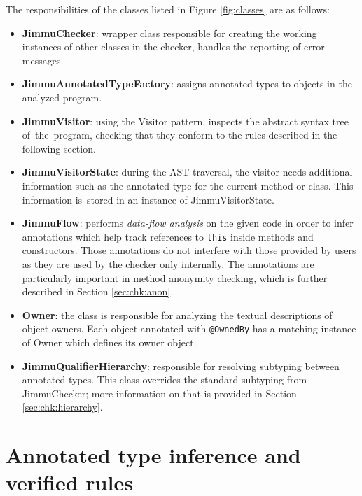 \documentclass{pracamgr}
\theoremstyle{break}
\theoremstyle{break}
\theoremstyle{break}
\begin{document}
The responsibilities of the classes listed in Figure \ref{fig:classes}
are as follows:
\begin{itemize}
\item \textbf{JimmuChecker}: wrapper class responsible for creating
  the working instances of other classes in the checker, handles the
  reporting of error messages.
\item \textbf{JimmuAnnotatedTypeFactory}: assigns annotated types to
  objects in the analyzed program.
\item \textbf{JimmuVisitor}: using the Visitor pattern, inspects the
  abstract syntax tree of~the~program, checking that they conform to
  the rules described in the following section. 
\item \textbf{JimmuVisitorState}: during the AST traversal, the
  visitor needs additional information such as the annotated type for
  the current method or class. This information is~stored in an
  instance of JimmuVisitorState. 
\item \textbf{JimmuFlow}: performs \emph{data-flow analysis} on the
  given code in order to infer annotations which help track references
  to \texttt{this} inside methods and constructors. Those annotations
  do not interfere with those provided by users as they are used by
  the checker only internally. The annotations are particularly
  important in method anonymity checking, which is further described
  in Section \ref{sec:chk:anon}.
\item \textbf{Owner}: the class is responsible for analyzing the
  textual descriptions of object owners. Each object annotated with
  \texttt{@OwnedBy} has a matching instance of Owner which defines its
  owner object.
\item \textbf{JimmuQualifierHierarchy}: responsible for resolving
  subtyping between annotated types. This class overrides the standard
  subtyping from JimmuChecker; more information on that is provided
  in Section \ref{sec:chk:hierarchy}. 
\end{itemize}

\section{Annotated type inference and verified rules}
\label{sec:rules}
\end{document}
